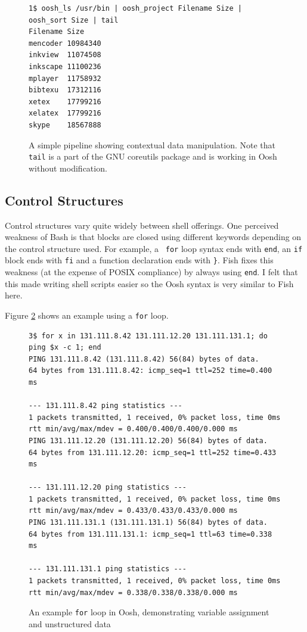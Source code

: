 \documentclass[12pt,twoside,notitlepage]{report}
\begin{document}
\begin{figure}[h]
\begin{verbatim}
1$ oosh_ls /usr/bin | oosh_project Filename Size | oosh_sort Size | tail
Filename Size
mencoder 10984340
inkview  11074508
inkscape 11100236
mplayer  11758932
bibtexu  17312116
xetex    17799216
xelatex  17799216
skype    18567888
\end{verbatim}
  \caption{A simple pipeline showing contextual data
    manipulation. Note that {\tt tail} is a part of the GNU coreutils
    package and is working in Oosh without modification.}
\label{lsexample}
\end{figure}

\subsection{Control Structures}
\label{forexample}

Control structures vary quite widely between shell offerings. One
perceived weakness of Bash is that blocks are closed using different
keywords depending on the control structure used. For example, a {\tt
  for} loop syntax ends with {\tt end}, an {\tt if} block ends with
{\tt fi} and a function declaration ends with {\tt \}}. Fish fixes
this weakness (at the expense of POSIX compliance) by always using
{\tt end}. I felt that this made writing shell scripts easier so the
Oosh syntax is very similar to Fish here.

Figure \ref{forloop} shows an example using a {\tt for} loop.

\begin{figure}[h]
\begin{verbatim}
3$ for x in 131.111.8.42 131.111.12.20 131.111.131.1; do ping $x -c 1; end
PING 131.111.8.42 (131.111.8.42) 56(84) bytes of data.
64 bytes from 131.111.8.42: icmp_seq=1 ttl=252 time=0.400 ms

--- 131.111.8.42 ping statistics ---
1 packets transmitted, 1 received, 0% packet loss, time 0ms
rtt min/avg/max/mdev = 0.400/0.400/0.400/0.000 ms
PING 131.111.12.20 (131.111.12.20) 56(84) bytes of data.
64 bytes from 131.111.12.20: icmp_seq=1 ttl=252 time=0.433 ms

--- 131.111.12.20 ping statistics ---
1 packets transmitted, 1 received, 0% packet loss, time 0ms
rtt min/avg/max/mdev = 0.433/0.433/0.433/0.000 ms
PING 131.111.131.1 (131.111.131.1) 56(84) bytes of data.
64 bytes from 131.111.131.1: icmp_seq=1 ttl=63 time=0.338 ms

--- 131.111.131.1 ping statistics ---
1 packets transmitted, 1 received, 0% packet loss, time 0ms
rtt min/avg/max/mdev = 0.338/0.338/0.338/0.000 ms
\end{verbatim}
\caption{An example {\tt for} loop in Oosh, demonstrating variable
  assignment and unstructured data}
\label{forloop}
\end{figure}
\end{document}
